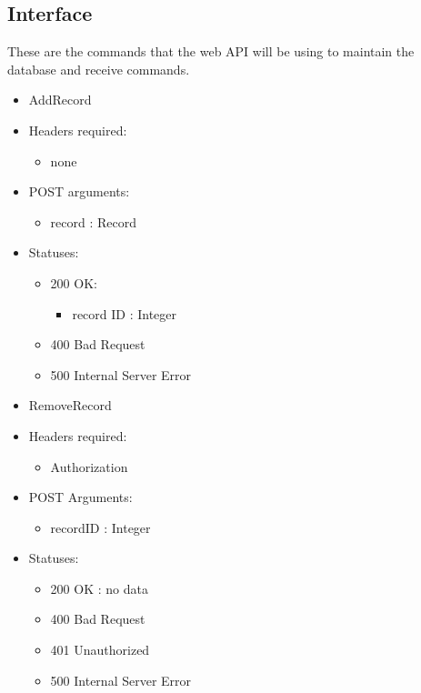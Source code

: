 \subsection{Interface}
    These are the commands that the web API will be using to maintain the database and receive commands.
    \begin{itemize}
        \item AddRecord
        \item Headers required:
        \begin{itemize}
            \item none
        \end{itemize}
        \item POST arguments:
        \begin{itemize}
            \item record : Record
        \end{itemize}
        \item Statuses:
        \begin{itemize}
        	\item 200 OK:
            \begin{itemize}
        		\item record ID : Integer
            \end{itemize}
        	\item 400 Bad Request
        	\item 500 Internal Server Error
        \end{itemize}

        \item RemoveRecord
        \item Headers required: 
        \begin{itemize}
        	\item Authorization
        \end{itemize}
        \item POST Arguments:
        \begin{itemize}
        	\item recordID : Integer
        \end{itemize}
        \item Statuses:
        \begin{itemize}
        	\item 200 OK : no data
        	\item 400 Bad Request
        	\item 401 Unauthorized
        	\item 500 Internal Server Error
        \end{itemize}


\end{itemize}
